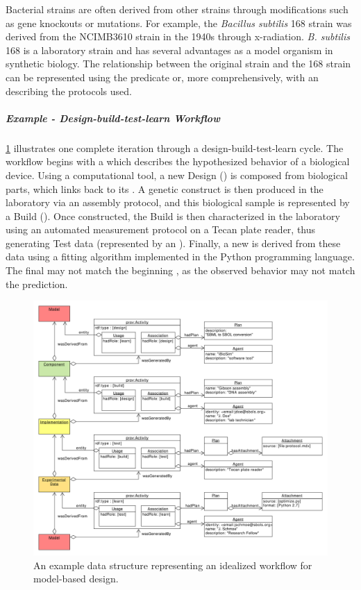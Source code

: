 Bacterial strains are often derived from other strains through modifications such as gene knockouts or mutations. For example, the \textit{Bacillus subtilis} 168 strain was derived from the NCIMB3610 strain in the 1940s through x-radiation. \textit{B. subtilis} 168 is a laboratory strain and has several advantages as a model organism in synthetic biology. 
The relationship between the original strain and the 168 strain can be represented using the  predicate or, more comprehensively, with an  describing the protocols used.

\subparagraph{Example - Design-build-test-learn Workflow}

\ref{images:design-build-test-learn} illustrates one complete iteration through a design-build-test-learn cycle.
The workflow begins with a  which describes the hypothesized behavior of a biological device. 
Using a computational tool, a new Design () is composed from biological parts, which links back to its . A genetic construct is then produced in the laboratory via an assembly protocol, and this biological sample is represented by a Build (). Once constructed, the Build is then characterized in the laboratory using an automated measurement protocol on a Tecan plate reader, thus generating Test data (represented by an ). Finally, a new  is derived from these data using a fitting algorithm implemented in the Python programming language. The final  may not match the beginning , as the observed behavior may not match the prediction. 

\begin{figure}[ht]
\begin{center}
\includegraphics[width=0.75\linewidth]{uml/design-build-test}
\caption[]{An example data structure representing an idealized workflow for model-based design.}
\label{images:design-build-test-learn}
\end{center}
\end{figure}

